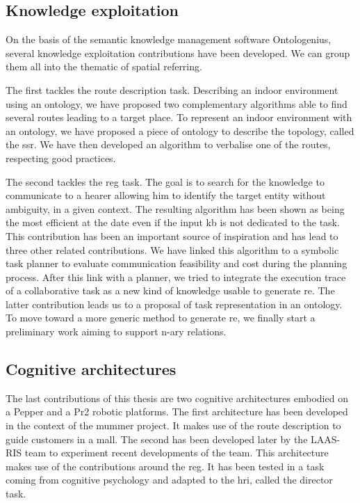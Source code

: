 \subsection{Knowledge exploitation}

On the basis of the semantic knowledge management software Ontologenius, several knowledge exploitation contributions have been developed. We can group them all into the thematic of spatial referring.

The first tackles the route description task. Describing an indoor environment using an ontology, we have proposed two complementary algorithms able to find several routes leading to a target place. To represent an indoor environment with an ontology, we have proposed a piece of ontology to describe the topology, called the \acrlong{ssr}. We have then developed an algorithm to verbalise one of the routes, respecting good practices.

The second tackles the \acrlong{reg} task. The goal is to search for the knowledge to communicate to a hearer allowing him to identify the target entity without ambiguity, in a given context. The resulting algorithm has been shown as being the most efficient at the date even if the input \acrshort{kb} is not dedicated to the task. This contribution has been an important source of inspiration and has lead to three other related contributions. We have linked this algorithm to a symbolic task planner to evaluate communication feasibility and cost during the planning process. After this link with a planner, we tried to integrate the execution trace of a collaborative task as a new kind of knowledge usable to generate \acrlong{re}. The latter contribution leads us to a proposal of task representation in an ontology. To move toward a more generic method to generate \acrlong{re}, we finally start a preliminary work aiming to support n-ary relations.

\subsection{Cognitive architectures}

The last contributions of this thesis are two cognitive architectures embodied on a Pepper and a Pr2 robotic platforms. The first architecture has been developed in the context of the \acrlong{mummer} project. It makes use of the route description to guide customers in a mall. The second has been developed later by the LAAS-RIS team to experiment recent developments of the team. This architecture makes use of the contributions around the \acrlong{reg}. It has been tested in a task coming from cognitive psychology and adapted to the \acrlong{hri}, called the director task.

